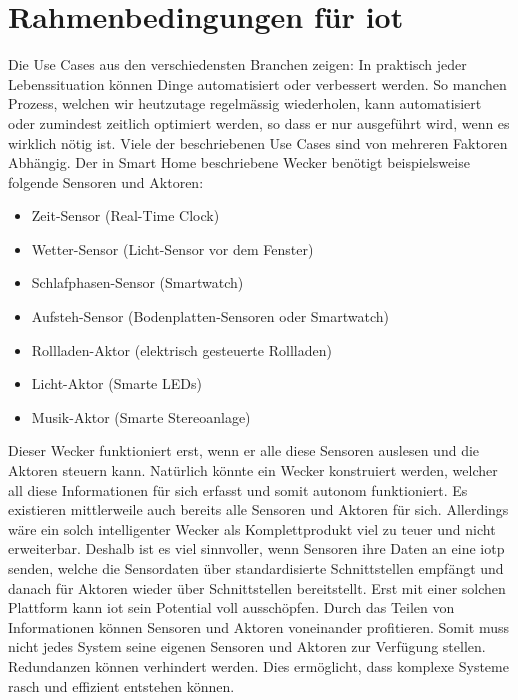 \chapter{Rahmenbedingungen für \gls{iot}} \label{Rahmenbedingungen für iot}
Die Use Cases aus den verschiedensten Branchen zeigen: In praktisch jeder Lebenssituation können Dinge automatisiert oder verbessert werden. So manchen Prozess, welchen wir heutzutage regelmässig wiederholen, kann automatisiert oder zumindest zeitlich optimiert werden, so dass er nur ausgeführt wird, wenn es wirklich nötig ist. Viele der beschriebenen Use Cases sind von mehreren Faktoren Abhängig. Der in Smart Home beschriebene Wecker benötigt beispielsweise folgende Sensoren und Aktoren:
\begin{itemize}  
  \item Zeit-Sensor (Real-Time Clock)
  \item Wetter-Sensor (Licht-Sensor vor dem Fenster)
  \item Schlafphasen-Sensor (Smartwatch)
  \item Aufsteh-Sensor (Bodenplatten-Sensoren oder Smartwatch)
  \item Rollladen-Aktor (elektrisch gesteuerte Rollladen)
  \item Licht-Aktor (Smarte LEDs)
  \item Musik-Aktor (Smarte Stereoanlage)
\end{itemize}
Dieser Wecker funktioniert erst, wenn er alle diese Sensoren auslesen und die Aktoren steuern kann. Natürlich könnte ein Wecker konstruiert werden, welcher all diese Informationen für sich erfasst und somit autonom funktioniert. Es existieren mittlerweile auch bereits alle Sensoren und Aktoren für sich. Allerdings wäre ein solch intelligenter Wecker als Komplettprodukt viel zu teuer und nicht erweiterbar. Deshalb ist es viel sinnvoller, wenn Sensoren ihre Daten an eine \gls{iotp} senden, welche die Sensordaten über standardisierte Schnittstellen empfängt und danach für Aktoren wieder über Schnittstellen bereitstellt. Erst mit einer solchen Plattform kann \gls{iot} sein Potential voll ausschöpfen. Durch das Teilen von Informationen können Sensoren und Aktoren voneinander profitieren.
Somit muss nicht jedes System seine eigenen Sensoren und Aktoren zur Verfügung stellen. Redundanzen können verhindert werden. Dies ermöglicht, dass komplexe Systeme rasch und effizient entstehen können.  

